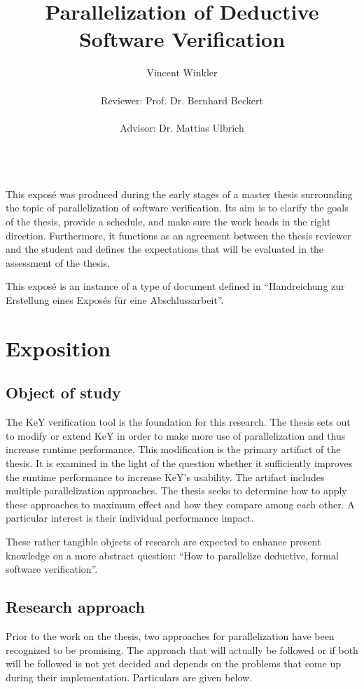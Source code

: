\documentclass{scrartcl}
\title{Parallelization of Deductive Software Verification}
\author{
    Vincent Winkler\\
    \vspace{1em}\\
    Reviewer: Prof. Dr. Bernhard Beckert\\
    \vspace{1em}\\
    Advisor: Dr. Mattias Ulbrich\\
    \vspace{1em}\\
}
\begin{document}
\maketitle

This exposé was produced during the early stages of a master thesis
surrounding the topic of parallelization of software verification.
Its aim is to clarify the goals of the thesis, provide a schedule,
and make sure the work heads in the right direction.
Furthermore, it functions as an agreement between the thesis reviewer and the student
and defines the expectations that will be evaluated in the assessment of the thesis.

This exposé is an instance of a type of document defined in
\enquote{Handreichung zur Erstellung eines Exposés für eine Abschlussarbeit}.

\section{Exposition}
\subsection{Object of study}
The KeY verification tool is the foundation for this research.
The thesis sets out to modify or extend KeY in order to make more use of parallelization
and thus increase runtime performance.
This modification is the primary artifact of the thesis.
It is examined in the light of the question whether it sufficiently improves the runtime
performance to increase KeY's usability.
The artifact includes multiple parallelization approaches.
The thesis seeks to determine how to apply these approaches to maximum effect
and how they compare among each other.
A particular interest is their individual performance impact.

These rather tangible objects of research are expected
to enhance present knowledge on a more abstract question:
\enquote{How to parallelize deductive, formal software verification}.

\subsection{Research approach}
Prior to the work on the thesis,
two approaches for parallelization have been recognized to be promising.
The approach that will actually be followed
or if both will be followed is not yet decided
and depends on the problems that come up during their implementation.
Particulars are given below.
\end{document}

